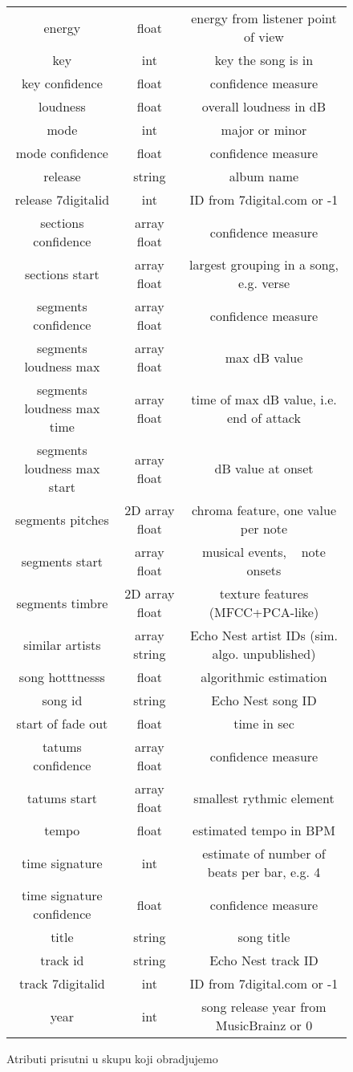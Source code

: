 \documentclass[a4paper]{article}
\begin{document}
\begin{figure}[!h]
\begin{tabular}{|c|c|c|}
        energy & float & energy from listener point of view \\
        key & int & key the song is in \\
        key confidence & float & confidence measure \\
        loudness & float & overall loudness in dB \\
        mode & int & major or minor \\
        mode confidence & float & confidence measure \\
        release & string & album name \\
        release 7digitalid & int & ID from 7digital.com or -1 \\
        sections confidence & array float & confidence measure \\
        sections start & array float & largest grouping in a song, e.g. verse \\
        segments confidence & array float & confidence measure \\
        segments loudness max & array float & max dB value \\
        segments loudness max time & array float & time of max dB value, i.e. end of attack \\
        segments loudness max start & array float & dB value at onset \\
        segments pitches & 2D array float & chroma feature, one value per note \\
        segments start & array float & musical events, ~ note onsets \\
        segments timbre & 2D array float & texture features (MFCC+PCA-like) \\
        similar artists & array string & Echo Nest artist IDs (sim. algo. unpublished) \\
        song hotttnesss & float & algorithmic estimation \\
        song id & string & Echo Nest song ID \\
        start of fade out & float & time in sec \\
        tatums confidence & array float & confidence measure \\
        tatums start & array float & smallest rythmic element \\
        tempo & float & estimated tempo in BPM \\
        time signature & int & estimate of number of beats per bar, e.g. 4 \\
        time signature confidence & float & confidence measure \\
        title & string & song title \\
        track id & string & Echo Nest track ID \\
        track 7digitalid & int & ID from 7digital.com or -1 \\
        year & int & song release year from MusicBrainz or 0 \\
        \hline
    \end{tabular}
    \label{Atributi}
    \caption{Atributi prisutni u skupu koji obradjujemo}
\end{figure}
\end{document}
